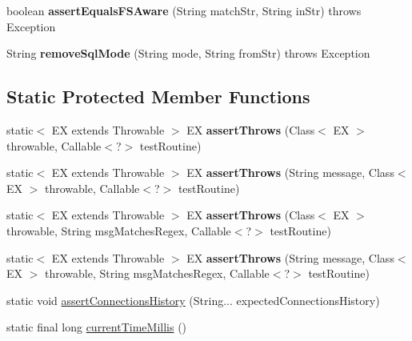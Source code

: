 \begin{DoxyCompactItemize}
\item 
\mbox{\label{classtestsuite_1_1_base_test_case_a5c1fa014de36c1991223cb4b32cab1fc}} 
boolean {\bfseries assert\+Equals\+F\+S\+Aware} (String match\+Str, String in\+Str)  throws Exception 
\item 
\mbox{\label{classtestsuite_1_1_base_test_case_a9df2dad075d7a0d282a1c46a9be4bf66}} 
String {\bfseries remove\+Sql\+Mode} (String mode, String from\+Str)  throws Exception 
\end{DoxyCompactItemize}
\subsection*{Static Protected Member Functions}
\begin{DoxyCompactItemize}
\item 
\mbox{\label{classtestsuite_1_1_base_test_case_ae34ffd921f16370341c4e642181840da}} 
static$<$ EX extends Throwable $>$ EX {\bfseries assert\+Throws} (Class$<$ EX $>$ throwable, Callable$<$?$>$ test\+Routine)
\item 
\mbox{\label{classtestsuite_1_1_base_test_case_aeb8b95d92ca70c6308fbf4f5bf701286}} 
static$<$ EX extends Throwable $>$ EX {\bfseries assert\+Throws} (String message, Class$<$ EX $>$ throwable, Callable$<$?$>$ test\+Routine)
\item 
\mbox{\label{classtestsuite_1_1_base_test_case_a4374e9b5e46f33c84aefeb7d5d7e49d5}} 
static$<$ EX extends Throwable $>$ EX {\bfseries assert\+Throws} (Class$<$ EX $>$ throwable, String msg\+Matches\+Regex, Callable$<$?$>$ test\+Routine)
\item 
\mbox{\label{classtestsuite_1_1_base_test_case_a933e368e79298cfda4960166ec2b078c}} 
static$<$ EX extends Throwable $>$ EX {\bfseries assert\+Throws} (String message, Class$<$ EX $>$ throwable, String msg\+Matches\+Regex, Callable$<$?$>$ test\+Routine)
\item 
static void \mbox{\hyperlink{classtestsuite_1_1_base_test_case_aca5533ef294301b97ad9d54a7edf825f}{assert\+Connections\+History}} (String... expected\+Connections\+History)
\item 
static final long \mbox{\hyperlink{classtestsuite_1_1_base_test_case_a48d748cca7b09172b6e5e2fac15c6bc7}{current\+Time\+Millis}} ()
\end{DoxyCompactItemize}

